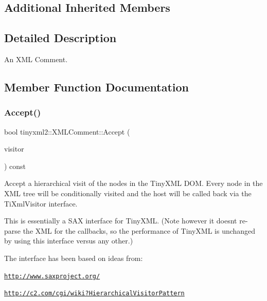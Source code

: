 \subsection*{Additional Inherited Members}


\subsection{Detailed Description}
An X\+ML Comment. 

\subsection{Member Function Documentation}
\mbox{\label{classtinyxml2_1_1XMLComment_a27b37d16cea01b5329dfbbb4f9508e39}} 
\subsubsection{\texorpdfstring{Accept()}{Accept()}\hspace{0.1cm}{\footnotesize\ttfamily [1/2]}}
{\footnotesize\ttfamily bool tinyxml2\+::\+X\+M\+L\+Comment\+::\+Accept (\begin{DoxyParamCaption}\item[{\hyperlink{classtinyxml2_1_1XMLVisitor}{X\+M\+L\+Visitor} $\ast$}]{visitor }\end{DoxyParamCaption}) const\hspace{0.3cm}{\ttfamily [virtual]}}

Accept a hierarchical visit of the nodes in the Tiny\+X\+ML D\+OM. Every node in the X\+ML tree will be conditionally visited and the host will be called back via the Ti\+Xml\+Visitor interface.

This is essentially a S\+AX interface for Tiny\+X\+ML. (Note however it doesn\textquotesingle{}t re-\/parse the X\+ML for the callbacks, so the performance of Tiny\+X\+ML is unchanged by using this interface versus any other.)

The interface has been based on ideas from\+:


\begin{DoxyItemize}
\item \href{http://www.saxproject.org/}{\tt http\+://www.\+saxproject.\+org/}
\item \href{http://c2.com/cgi/wiki?HierarchicalVisitorPattern}{\tt http\+://c2.\+com/cgi/wiki?\+Hierarchical\+Visitor\+Pattern}
\end{DoxyItemize}

